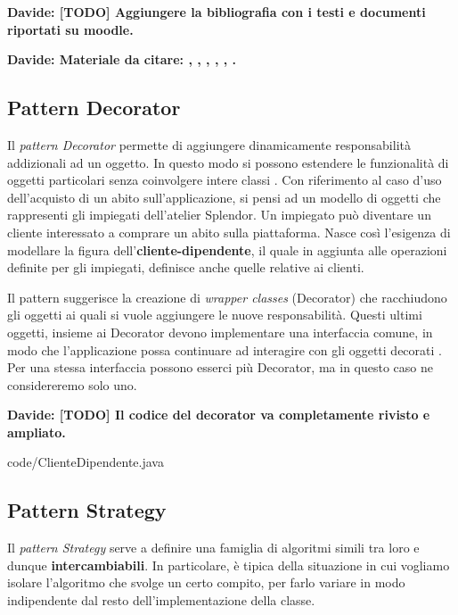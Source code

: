 \documentclass[12pt]{article}
\newcommand{\davide}[1]{{\bf \color{chromeyellow} Davide: #1 }}
\begin{document}
\davide{\textbf{[TODO]} Aggiungere la bibliografia con i testi e documenti riportati su moodle.}

\davide{Materiale da citare: \cite{gof_riferimento}, \cite{up-riferimento}, \cite{uml_riferimento}, \cite{elicitation_tools}, \cite{gof_sunt}, \cite{github}.}


\subsection{Pattern Decorator}

Il {\em pattern Decorator} permette di aggiungere dinamicamente responsabilità addizionali ad un oggetto. In questo modo si possono estendere le funzionalità di oggetti particolari senza coinvolgere intere classi \cite{gof_sunt}.
Con riferimento al caso d'uso dell'acquisto di un abito sull'applicazione, si pensi ad un modello di oggetti che rappresenti gli impiegati dell'atelier Splendor. Un impiegato può diventare un cliente interessato a comprare un abito sulla piattaforma. Nasce così l'esigenza di modellare la figura dell'\textbf{cliente-dipendente}, il quale in aggiunta alle operazioni definite per gli impiegati, definisce anche quelle relative ai clienti.

Il pattern suggerisce la creazione di {\em wrapper classes} (Decorator) che racchiudono gli oggetti ai quali si vuole aggiungere le nuove responsabilità. Questi ultimi oggetti, insieme ai Decorator devono implementare una interfaccia comune, in modo che l’applicazione possa continuare ad interagire con gli oggetti decorati \cite{gof_sunt}.
Per una stessa interfaccia possono esserci più Decorator, ma in questo caso ne considereremo solo uno.

\davide{\textbf{[TODO]} Il codice del decorator va completamente rivisto e ampliato.}


{code/ClienteDipendente.java}


\subsection{Pattern Strategy}

Il {\em pattern Strategy} serve a definire una famiglia di algoritmi simili tra loro e dunque \textbf{intercambiabili}. In particolare, è tipica della situazione in cui vogliamo isolare l’algoritmo che svolge un certo compito, per farlo variare in modo indipendente dal resto dell’implementazione della classe.
\end{document}
